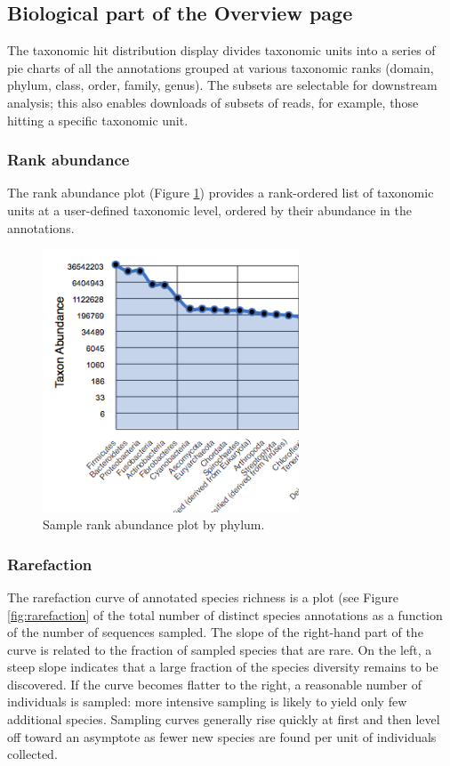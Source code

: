 \documentclass[12pt,fullpage]{report}
\begin{document}
\subsection{Biological part of the Overview page }

The taxonomic hit distribution display divides taxonomic units into a series of pie charts of all the annotations grouped at various taxonomic ranks (domain, phylum, class, order, family, genus). The subsets are selectable for downstream analysis; this also enables downloads of subsets of reads, for example, those hitting a specific taxonomic unit.
\subsubsection{Rank abundance}

The rank abundance plot (Figure \ref{fig:rank-abundance}) provides a rank-ordered list of taxonomic units at a user-defined taxonomic level, ordered by their abundance in the annotations.

\begin{figure}
\begin{center}
\includegraphics[width=3in]{Images/rank-abundance.png}
\end{center}
\caption{
Sample rank abundance plot by phylum.
}
\label{fig:rank-abundance}
\end{figure}
\subsubsection{Rarefaction}
The rarefaction curve of annotated species richness is a plot (see Figure \ref{fig:rarefaction} of the total number of distinct species annotations as a function of the number of sequences sampled.
The slope of the right-hand part of the curve is related to the fraction of sampled species that are rare.
On the left, a steep slope indicates that a large fraction of the species diversity remains to be discovered. If the curve becomes flatter to the right, a reasonable number of individuals is sampled: more intensive sampling is likely to yield only few additional species.
Sampling curves generally rise quickly at first and then level off toward an asymptote as fewer new species are found per unit of individuals collected.
\end{document}
